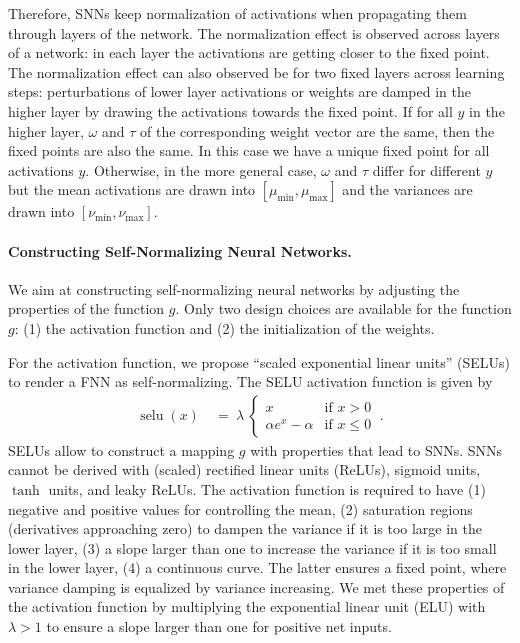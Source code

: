 \documentclass{article}
\renewcommand{\leq}{\leqslant}
\DeclareMathOperator{\selu}{selu}
\begin{document}
Therefore, SNNs
keep normalization of activations when propagating them 
through layers of the network. 
The normalization effect is observed across layers of a network: 
in each layer the activations are getting closer to the fixed point.
The normalization effect can also observed be for two fixed layers across learning steps: perturbations of lower layer activations or
weights are damped in the higher layer by drawing the activations
towards the fixed point.
If for all $y$ in the higher layer, $\omega$
and $\tau$ of the corresponding weight vector are the same, then
the fixed points are also the same. In this case we have a
unique fixed point for all activations $y$. 
Otherwise, in the more general case, $\omega$
and $\tau$ differ for different $y$ but the mean activations are
drawn into $[\mu_{\min},\mu_{\max}]$ and the variances
are drawn into $[\nu_{\min},\nu_{\max}]$.


\paragraph{Constructing Self-Normalizing Neural Networks.}
We aim at constructing self-normalizing
neural networks by adjusting the properties of the function $g$.
Only two design choices are available for the
function $g$: 
(1) the activation function and 
(2) the initialization of the weights.

For the activation function,
we propose ``scaled exponential linear units'' (SELUs) to render a FNN
as self-normalizing. The SELU activation function is given by 
\begin{align}
 \selu(x) \ &= \ \lambda 
\ \begin{cases}
  x & \text{if } x > 0 \\
 \alpha e^{x}-\alpha & \text{if } x \leq 0
 \end{cases}  \ .
\end{align}
SELUs allow to construct a mapping $g$ with properties that lead to SNNs.
SNNs cannot be derived with (scaled)
rectified linear units (ReLUs), sigmoid units, $\tanh$ units, and leaky
ReLUs.
The activation function is required to have 
(1) negative and positive values for controlling the mean,
(2) saturation regions (derivatives approaching zero) to dampen the variance if
it is too large in the lower layer, 
(3) a slope larger than one to increase the variance if
it is too small in the lower layer,
(4) a continuous curve. 
The latter ensures a fixed point, where variance damping is equalized by variance increasing.
We met these properties of the activation function by multiplying the exponential linear
unit (ELU) \citep{bib:Clevert2015} with $\lambda>1$ to ensure a slope larger than one
for positive net inputs. 
\end{document}
